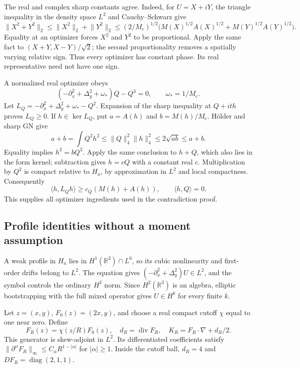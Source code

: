 \documentclass[11pt]{article}
\theoremstyle{definition}
\theoremstyle{remark}
\DeclareMathOperator{\diag}{diag}
\DeclareMathOperator{\diver}{div}
\newcommand{\R}{\mathbb R}
\newcommand{\ip}[2]{\langle #1,#2\rangle}
\newcommand{\norm}[1]{\lVert #1\rVert}
\newcommand{\mc}{M_{\mathrm c}}
\begin{document}
The real and complex sharp constants agree. Indeed, for $U=X+iY$, the triangle inequality in the density space $L^2$ and Cauchy--Schwarz give
\[
 \norm{X^2+Y^2}_2\le\norm{X^2}_2+\norm{Y^2}_2
 \le(2/\mc)^{1/2}\bigl(M(X)^{1/2}A(X)^{1/2}
                              +M(Y)^{1/2}A(Y)^{1/2}\bigr).
\]
Equality at an optimizer forces $X^2$ and $Y^2$ to be proportional. Apply the same fact to $(X+Y,X-Y)/\sqrt2$; the second proportionality removes a spatially varying relative sign. Thus every optimizer has constant phase. Its real representative need not have one sign.

A normalized real optimizer obeys
\[
 (-\partial_x^2+\Delta_y^2+\omega_*)Q-Q^3=0,
 \qquad \omega_*=1/\mc.
\]
Let $L_Q=-\partial_x^2+\Delta_y^2+\omega_*-Q^2$. Expansion of the sharp inequality at $Q+ith$ proves $L_Q\ge0$. If $h\in\ker L_Q$, put $a=A(h)$ and $b=M(h)/\mc$. H\"older and sharp GN give
\[
 a+b=\int Q^2h^2\le\norm Q_4^2\norm h_4^2
 \le2\sqrt{ab}\le a+b.
\]
Equality implies $h^2=bQ^2$. Apply the same conclusion to $h+Q$, which also lies in the form kernel; subtraction gives $h=cQ$ with a constant real $c$. Multiplication by $Q^2$ is compact relative to $H_a$, by approximation in $L^2$ and local compactness. Consequently
\begin{equation}\label{eq:mixedcoercive}
 \ip h{L_Qh}\ge c_Q(M(h)+A(h)),\qquad \ip hQ=0.
\end{equation}
This supplies all optimizer ingredients used in the contradiction proof.

\subsection{Profile identities without a moment assumption}

A weak profile in $H_a$ lies in $H^1(\R^3)\cap L^6$, so its cubic nonlinearity and first-order drifts belong to $L^2$. The equation gives $(-\partial_x^2+\Delta_y^2)U\in L^2$, and the symbol controls the ordinary $H^2$ norm. Since $H^2(\R^3)$ is an algebra, elliptic bootstrapping with the full mixed operator gives $U\in H^k$ for every finite $k$.

Let $z=(x,y)$, $F_0(z)=(2x,y)$, and choose a real compact cutoff $\chi$ equal to one near zero. Define
\[
 F_R(z)=\chi(z/R)F_0(z),\quad d_R=\diver F_R,
 \quad K_R=F_R\cdot\nabla+d_R/2.
\]
This generator is skew-adjoint in $L^2$. Its differentiated coefficients satisfy $\norm{\partial^\alpha F_R}_\infty\le C_\alpha R^{1-|\alpha|}$ for $|\alpha|\ge1$. Inside the cutoff ball, $d_R=4$ and $DF_R=\diag(2,1,1)$.
\end{document}
